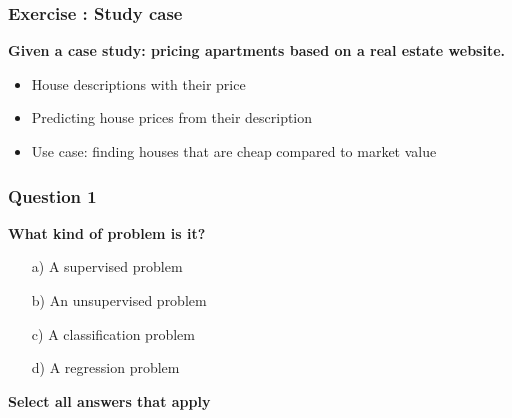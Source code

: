 \documentclass{beamer}
\begin{document}
\begin{frame}
	\frametitle{Exercise : Study case}
	
	\begin{center}
		\textbf{Given a case study: pricing apartments based on a real estate website.}
	\end{center}
	
	\vspace{0.5cm}
	
	\begin{itemize}
		\item House descriptions with their price
		\item Predicting house prices from their description
		\item Use case: finding houses that are cheap compared to market value
	\end{itemize}
	
\end{frame}

\begin{frame}
	\frametitle{Question 1}
	\textbf{What kind of problem is it?}
	
	\begin{enumerate}
		\item[a)] A supervised problem
		\item[b)] An unsupervised problem
		\item[c)] A classification problem
		\item[d)] A regression problem
	\end{enumerate}
	
	\vspace{0.5cm}
	
	\textbf{Select all answers that apply}
	
\end{frame}
\end{document}
